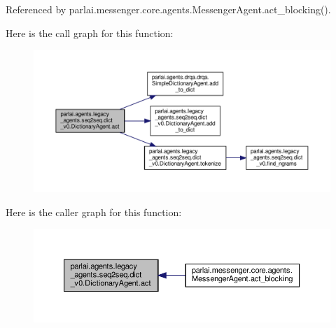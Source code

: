 Referenced by parlai.\+messenger.\+core.\+agents.\+Messenger\+Agent.\+act\+\_\+blocking().

Here is the call graph for this function\+:
\nopagebreak
\begin{figure}[H]
\begin{center}
\leavevmode
\includegraphics[width=350pt]{classparlai_1_1agents_1_1legacy__agents_1_1seq2seq_1_1dict__v0_1_1DictionaryAgent_ab0369e37e5da8b1d44a95c4765701cdc_cgraph}
\end{center}
\end{figure}
Here is the caller graph for this function\+:
\nopagebreak
\begin{figure}[H]
\begin{center}
\leavevmode
\includegraphics[width=350pt]{classparlai_1_1agents_1_1legacy__agents_1_1seq2seq_1_1dict__v0_1_1DictionaryAgent_ab0369e37e5da8b1d44a95c4765701cdc_icgraph}
\end{center}
\end{figure}
\mbox{\label{classparlai_1_1agents_1_1legacy__agents_1_1seq2seq_1_1dict__v0_1_1DictionaryAgent_afa68d3dfd4b59fdfe7304b0153c18f03}} 
